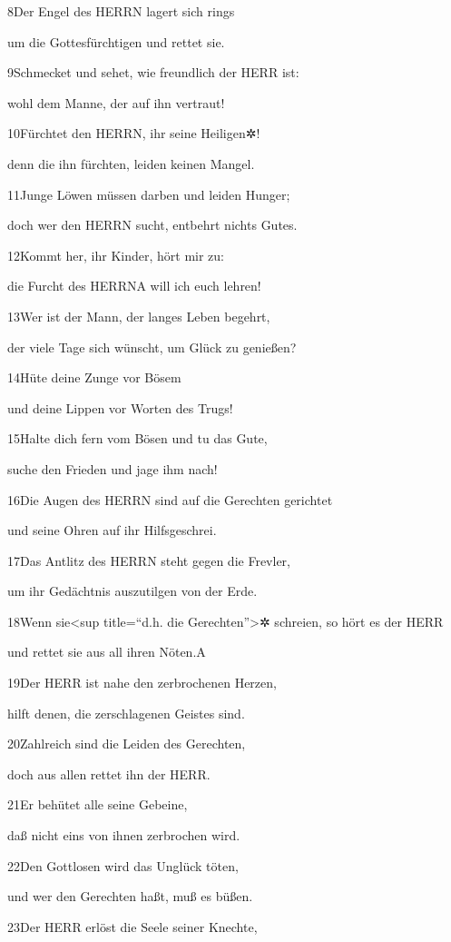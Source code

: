 8Der Engel des HERRN lagert sich rings

um die Gottesfürchtigen und rettet sie.

9Schmecket und sehet, wie freundlich der HERR ist:

wohl dem Manne, der auf ihn vertraut!

10Fürchtet den HERRN, ihr seine Heiligen✲!

denn die ihn fürchten, leiden keinen Mangel.

11Junge Löwen müssen darben und leiden Hunger;

doch wer den HERRN sucht, entbehrt nichts Gutes.

12Kommt her, ihr Kinder, hört mir zu:

die Furcht des HERRN{A} will ich euch lehren!

13Wer ist der Mann, der langes Leben begehrt,

der viele Tage sich wünscht, um Glück zu genießen?

14Hüte deine Zunge vor Bösem

und deine Lippen vor Worten des Trugs!

15Halte dich fern vom Bösen und tu das Gute,

suche den Frieden und jage ihm nach!

16Die Augen des HERRN sind auf die Gerechten gerichtet

und seine Ohren auf ihr Hilfsgeschrei.

17Das Antlitz des HERRN steht gegen die Frevler,

um ihr Gedächtnis auszutilgen von der Erde.

18Wenn sie\textless sup title=``d.h. die Gerechten''\textgreater✲
schreien, so hört es der HERR

und rettet sie aus all ihren Nöten.{A}

19Der HERR ist nahe den zerbrochenen Herzen,

hilft denen, die zerschlagenen Geistes sind.

20Zahlreich sind die Leiden des Gerechten,

doch aus allen rettet ihn der HERR.

21Er behütet alle seine Gebeine,

daß nicht eins von ihnen zerbrochen wird.

22Den Gottlosen wird das Unglück töten,

und wer den Gerechten haßt, muß es büßen.

23Der HERR erlöst die Seele seiner Knechte,

